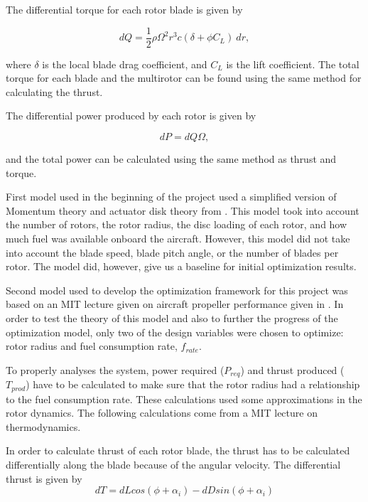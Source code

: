 \documentclass[letterpaper, 10 pt, conference]{ieeeconf}  %
\begin{document}
The differential torque for each rotor blade is given by

\begin{equation}
	dQ = \frac{1}{2} \rho \Omega^2 r^3 c (\delta + \phi C_L) \ dr,
	\label{torque_eqn}
\end{equation}

where $\delta$ is the local blade drag coefficient, and $C_L$ is the lift coefficient. The total torque for each blade and the multirotor can be found using the same method for calculating the thrust. 

The differential power produced by each rotor is given by 

\begin{equation}
	dP = dQ\Omega,
\end{equation}

and the total power can be calculated using the same method as thrust and torque. 

First model used in the beginning of the project used a simplified version of Momentum theory and actuator disk theory from \cite{helicopters2016}. This model took into account the number of rotors, the rotor radius, the disc loading of each rotor, and how much fuel was available onboard the aircraft. However, this model did not take into account the blade speed, blade pitch angle, or the number of blades per rotor. The model did, however, give us a baseline for initial optimization results.

Second model used to develop the optimization framework for this project was based on an MIT lecture given on aircraft propeller performance given in \cite{mit2016}. In order to test the theory of this model and also to further the progress of the optimization model, only two of the design variables were chosen to optimize: rotor radius and fuel consumption rate, $f_{rate}$. 

To properly analyses the system, power required ($P_{req}$) and thrust produced ($T_{prod}$) have to be calculated to make sure that the rotor radius had a relationship to the fuel consumption rate. These calculations used some approximations in the rotor dynamics. The following calculations come from a MIT lecture on thermodynamics.

In order to calculate thrust of each rotor blade, the thrust has to be calculated differentially along the blade because of the angular velocity. The differential thrust is given by 
\begin{equation}
	dT = dLcos(\phi + \alpha_i) - dDsin(\phi + \alpha_i)
\end{equation}
\end{document}
